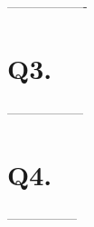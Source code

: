 \documentclass[a4paper,11pt]{article}
\newenvironment{absolutelynopagebreak}
  {\par\nobreak\vfil\penalty0\vfilneg
   \vtop\bgroup}
  {\par\xdef\tpd{\the\prevdepth}\egroup
   \prevdepth=\tpd}
\begin{document}
% 


\begin{center}
 -------------------
\end{center}
\section*{Q3.}

\begin{center}
 ------------------
\end{center}
\section*{Q4.}

\begin{center}
-----------------\\
\end{center}
% 
% 
\end{document}
